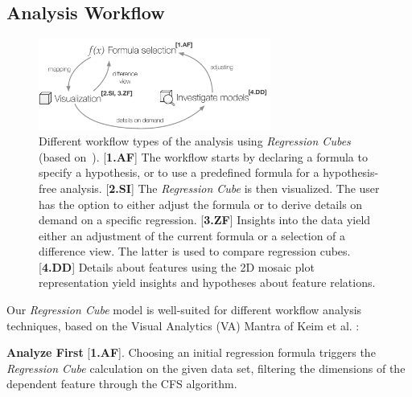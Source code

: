 \documentclass[journal]{style/vgtc} 			          %
\newcommand{\com}[1]{\textcolor{orange}{\uline{#1}}}
\begin{document}
\subsection{Analysis Workflow} \label{sec:Workflow}
\begin{figure}[htb]
 \centering
 \includegraphics[width=3.0in]{figures/workflow}
 \caption{
 Different workflow types of the analysis using \emph{Regression Cubes} (based on~\cite{Keim}).
 [\textbf{1.AF}] The workflow starts by declaring a formula to specify a hypothesis, or to use a predefined formula for a hypothesis-free analysis.
 [\textbf{2.SI}] The \emph{Regression Cube} is then visualized.
 The user has the option to either adjust the formula or to derive details on demand on a specific regression.
 [\textbf{3.ZF}] Insights into the data yield either an adjustment of the current formula or a selection of a difference view.
 The latter is used to compare regression cubes.
 [\textbf{4.DD}] Details about features using the 2D mosaic plot representation yield insights and hypotheses about feature relations.
 }
  \label{fig:Workflow}
\end{figure}
Our \emph{Regression Cube} model is well-suited for different workflow analysis techniques, based on the Visual Analytics (VA) Mantra of Keim et al. \cite{Keim}:

\textbf{Analyze First} [\textbf{1.AF}]. Choosing an initial regression formula triggers the \emph{Regression Cube} calculation on the given data set, filtering the dimensions of the dependent feature through the CFS algorithm.
\end{document}
